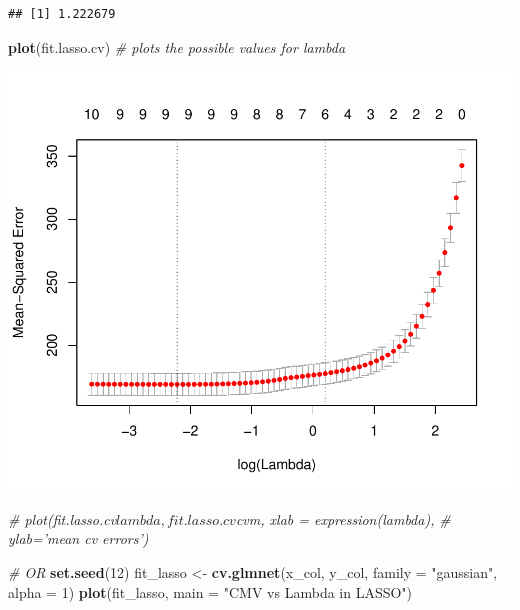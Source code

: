\documentclass[]{article}
\newenvironment{Shaded}{\begin{snugshade}}{\end{snugshade}}
\newcommand{\KeywordTok}[1]{\textcolor[rgb]{0.13,0.29,0.53}{\textbf{#1}}}
\newcommand{\DataTypeTok}[1]{\textcolor[rgb]{0.13,0.29,0.53}{#1}}
\newcommand{\DecValTok}[1]{\textcolor[rgb]{0.00,0.00,0.81}{#1}}
\newcommand{\StringTok}[1]{\textcolor[rgb]{0.31,0.60,0.02}{#1}}
\newcommand{\CommentTok}[1]{\textcolor[rgb]{0.56,0.35,0.01}{\textit{#1}}}
\newcommand{\NormalTok}[1]{#1}
\begin{document}
\begin{verbatim}
## [1] 1.222679
\end{verbatim}

\begin{Shaded}
\begin{Highlighting}[]
\KeywordTok{plot}\NormalTok{(fit.lasso.cv)  }\CommentTok{# plots the possible values for lambda}
\end{Highlighting}
\end{Shaded}

\begin{flushleft}\includegraphics{Midterm_11_01_2016_Answers_files/figure-latex/unnamed-chunk-32-1} \end{flushleft}

\begin{Shaded}
\begin{Highlighting}[]
\CommentTok{# plot(fit.lasso.cv$lambda, fit.lasso.cv$cvm, xlab = expression(lambda),}
\CommentTok{# ylab='mean cv errors')}

\CommentTok{# OR}
\KeywordTok{set.seed}\NormalTok{(}\DecValTok{12}\NormalTok{)}
\NormalTok{fit_lasso <-}\StringTok{ }\KeywordTok{cv.glmnet}\NormalTok{(x_col, y_col, }\DataTypeTok{family =} \StringTok{"gaussian"}\NormalTok{, }\DataTypeTok{alpha =} \DecValTok{1}\NormalTok{)}
\KeywordTok{plot}\NormalTok{(fit_lasso, }\DataTypeTok{main =} \StringTok{"CMV vs Lambda in LASSO"}\NormalTok{)}
\end{Highlighting}
\end{Shaded}
\end{document}
